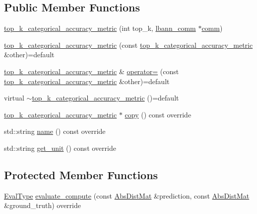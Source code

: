 \subsection*{Public Member Functions}
\begin{DoxyCompactItemize}
\item 
\hyperlink{classlbann_1_1top__k__categorical__accuracy__metric_a3896f230e2972c01b746fc808c51462e}{top\+\_\+k\+\_\+categorical\+\_\+accuracy\+\_\+metric} (int top\+\_\+k, \hyperlink{classlbann_1_1lbann__comm}{lbann\+\_\+comm} $\ast$\hyperlink{file__io_8cpp_ab048c6f9fcbcfaa57ce68b00263dbebe}{comm})
\item 
\hyperlink{classlbann_1_1top__k__categorical__accuracy__metric_a3a79aaa2c235ba13b366eed78cabeaf1}{top\+\_\+k\+\_\+categorical\+\_\+accuracy\+\_\+metric} (const \hyperlink{classlbann_1_1top__k__categorical__accuracy__metric}{top\+\_\+k\+\_\+categorical\+\_\+accuracy\+\_\+metric} \&other)=default
\item 
\hyperlink{classlbann_1_1top__k__categorical__accuracy__metric}{top\+\_\+k\+\_\+categorical\+\_\+accuracy\+\_\+metric} \& \hyperlink{classlbann_1_1top__k__categorical__accuracy__metric_a2036cad8a7f9cb7490bf0341de0d70eb}{operator=} (const \hyperlink{classlbann_1_1top__k__categorical__accuracy__metric}{top\+\_\+k\+\_\+categorical\+\_\+accuracy\+\_\+metric} \&other)=default
\item 
virtual \hyperlink{classlbann_1_1top__k__categorical__accuracy__metric_a71a9e2ae447bd0013ada063d9616c816}{$\sim$top\+\_\+k\+\_\+categorical\+\_\+accuracy\+\_\+metric} ()=default
\item 
\hyperlink{classlbann_1_1top__k__categorical__accuracy__metric}{top\+\_\+k\+\_\+categorical\+\_\+accuracy\+\_\+metric} $\ast$ \hyperlink{classlbann_1_1top__k__categorical__accuracy__metric_a2d93a9bca14d52bda02a58e4c58b800e}{copy} () const override
\item 
std\+::string \hyperlink{classlbann_1_1top__k__categorical__accuracy__metric_a7b49f722f75dabe73c0fc3500d72ef63}{name} () const override
\item 
std\+::string \hyperlink{classlbann_1_1top__k__categorical__accuracy__metric_a0531d4f199fa61ce448af8c945ff3dfc}{get\+\_\+unit} () const override
\end{DoxyCompactItemize}
\subsection*{Protected Member Functions}
\begin{DoxyCompactItemize}
\item 
\hyperlink{base_8hpp_a3266f5ac18504bbadea983c109566867}{Eval\+Type} \hyperlink{classlbann_1_1top__k__categorical__accuracy__metric_a3449bdb835e7e5bd7d17cd001fb4ae38}{evaluate\+\_\+compute} (const \hyperlink{base_8hpp_a9a697a504ae84010e7439ffec862b470}{Abs\+Dist\+Mat} \&prediction, const \hyperlink{base_8hpp_a9a697a504ae84010e7439ffec862b470}{Abs\+Dist\+Mat} \&ground\+\_\+truth) override
\end{DoxyCompactItemize}
